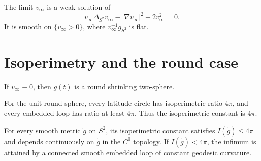 \begin{lemma}
\label{lem:chow-iv-backward-pressure-stationary}
The limit \(v_\infty\) is a weak solution of
\[
 v_\infty\Delta_{S^2}v_\infty-|\nabla v_\infty|^2+2v_\infty^2=0.
\]
It is smooth on \(\{v_\infty>0\}\), where
\(v_\infty^{-1}g_{S^2}\) is flat.
\end{lemma}

\section{Isoperimetry and the round case}

\begin{proposition}
\label{prop:chow-iv-zero-backward-pressure-round}
If \(v_\infty\equiv0\), then \(g(t)\) is a round shrinking two-sphere.
\end{proposition}

\begin{example}
\label{ex:chow-iv-unit-sphere-isoperimetric-constant}
For the unit round sphere, every latitude circle has isoperimetric ratio
\(4\pi\), and every embedded loop has ratio at least \(4\pi\).  Thus the
isoperimetric constant is \(4\pi\).
\end{example}

\begin{lemma}
\label{lem:chow-iv-isoperimetric-minimizers}
For every smooth metric \(\widetilde g\) on \(S^2\), its isoperimetric
constant satisfies \(I(\widetilde g)\le4\pi\) and depends continuously on
\(\widetilde g\) in the \(C^0\) topology.  If \(I(\widetilde g)<4\pi\), the
infimum is attained by a connected smooth embedded loop of constant geodesic
curvature.
\end{lemma}

